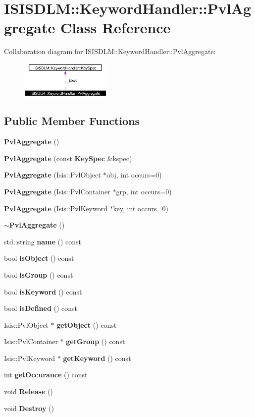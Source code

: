 \section{ISISDLM::Keyword\-Handler::Pvl\-Aggregate Class Reference}
\label{classISISDLM_1_1KeywordHandler_1_1PvlAggregate}
Collaboration diagram for ISISDLM::Keyword\-Handler::Pvl\-Aggregate:\begin{figure}[H]
\begin{center}
\leavevmode
\includegraphics[width=126pt]{classISISDLM_1_1KeywordHandler_1_1PvlAggregate__coll__graph}
\end{center}
\end{figure}
\subsection*{Public Member Functions}
\begin{CompactItemize}
\item 
{\bf Pvl\-Aggregate} ()
\item 
{\bf Pvl\-Aggregate} (const {\bf Key\-Spec} \&kspec)
\item 
{\bf Pvl\-Aggregate} (Isis::Pvl\-Object $\ast$obj, int occurs=0)
\item 
{\bf Pvl\-Aggregate} (Isis::Pvl\-Container $\ast$grp, int occurs=0)
\item 
{\bf Pvl\-Aggregate} (Isis::Pvl\-Keyword $\ast$key, int occurs=0)
\item 
{\bf $\sim$Pvl\-Aggregate} ()
\item 
std::string {\bf name} () const
\item 
bool {\bf is\-Object} () const
\item 
bool {\bf is\-Group} () const
\item 
bool {\bf is\-Keyword} () const
\item 
bool {\bf is\-Defined} () const
\item 
Isis::Pvl\-Object $\ast$ {\bf get\-Object} () const
\item 
Isis::Pvl\-Container $\ast$ {\bf get\-Group} () const
\item 
Isis::Pvl\-Keyword $\ast$ {\bf get\-Keyword} () const
\item 
int {\bf get\-Occurance} () const
\item 
void {\bf Release} ()
\item 
void {\bf Destroy} ()
\end{CompactItemize}
